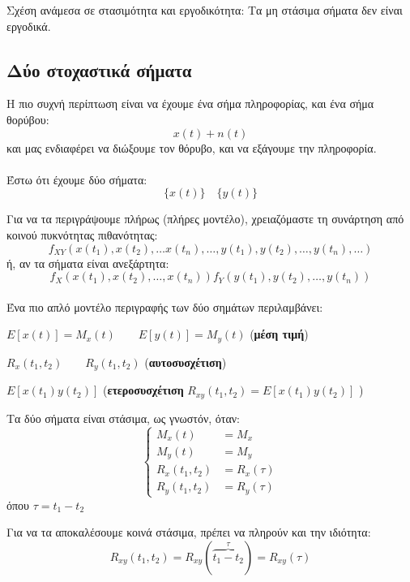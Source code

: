 \documentclass[11pt,a4paper,notitlepage,fleqn,draft]{article}
\begin{document}
Σχέση ανάμεσα σε στασιμότητα και εργοδικότητα:
Τα μη στάσιμα σήματα δεν είναι εργοδικά.

\subsection{Δύο στοχαστικά σήματα}
Η πιο συχνή περίπτωση είναι να έχουμε ένα σήμα πληροφορίας, και ένα
σήμα θορύβου:
\[
x(t) + n(t)
\]
και μας ενδιαφέρει να διώξουμε τον θόρυβο, και να εξάγουμε την
πληροφορία.

\paragraph{}
Έστω ότι έχουμε δύο σήματα:
\[
\big\lbrace x(t) \big\rbrace \quad
\big\lbrace y(t) \big\rbrace
\]

Για να τα περιγράψουμε πλήρως (πλήρες μοντέλο),
χρειαζόμαστε τη συνάρτηση από κοινού πυκνότητας πιθανότητας:
\[
f_{XY} \left(
x(t_1),x(t_2),\dots x(t_n),\dots,
y(t_1),y(t_2),\dots,y(t_n),\dots
\right)
\]
ή, αν τα σήματα είναι ανεξάρτητα:
\[
f_X\left(x(t_1),x(t_2),\dots,x(t_n)\right)
f_Y\left(y(t_1),y(t_2),\dots,y(t_n)\right)
\]

\paragraph{}
Ένα πιο απλό μοντέλο περιγραφής των δύο σημάτων περιλαμβάνει:
\begin{enumroman}
	\item \( E\left[x(t)\right] = M_x(t)
	\qquad E\left[ y(t) \right] = M_y(t)
	 \) (\textbf{μέση τιμή})
	\item \( R_x(t_1,t_2)\qquad R_y(t_1,t_2) \)
	(\textbf{αυτοσυσχέτιση})
	\item \( E\left[x(t_1)y(t_2)\right] \)
	(\textbf{ετεροσυσχέτιση} \( R_{xy}(t_1,t_2)=
	E\left[x(t_1)y(t_2)\right] \) )
\end{enumroman}

Τα δύο σήματα είναι στάσιμα, ως γνωστόν, όταν:
\[
\begin{cases}
M_x(t) &= M_x \\
M_y(t) &= M_y \\
R_x(t_1,t_2) &= R_x(\tau) \\
R_y(t_1,t_2) &= R_y(\tau)
\end{cases}
\]
όπου \( \tau = t_1-t_2 \)

Για να τα αποκαλέσουμε κοινά στάσιμα, πρέπει να πληρούν και την ιδιότητα:
\[
R_{xy}(t_1,t_2) = R_{xy}(\overbrace{t_1-t_2}^{\tau}) = R_{xy}(\tau)
\]
\end{document}
